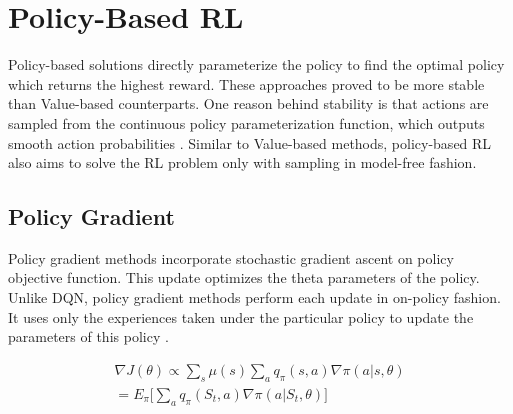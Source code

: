 \section{Policy-Based RL}

Policy-based solutions directly parameterize the policy to find the optimal policy which returns the highest reward. These approaches proved to be more stable than Value-based counterparts. One reason behind stability is that actions are sampled from the continuous policy parameterization function, which outputs smooth action probabilities \cite{Sutton2018}. Similar to Value-based methods, policy-based RL also aims to solve the RL problem only with sampling in model-free fashion.

\subsection{Policy Gradient}

Policy gradient methods incorporate stochastic gradient ascent on policy objective function. This update optimizes the theta parameters of the policy. Unlike DQN, policy gradient methods perform each update in on-policy fashion. It uses only the experiences taken under the particular policy to update the parameters of this policy \cite{SpinningUp2018}.

\begin{align}
    \nabla J(\theta) \propto \sum\limits_s \mu(s) \sum\limits_a q_{\pi}(s,a)\nabla \pi(a | s, \theta)\\
    = E_{\pi} \Big[\sum\limits_a q_{\pi}(S_t,a)\nabla\pi(a | S_t, \theta)\Big]
\end{align}

